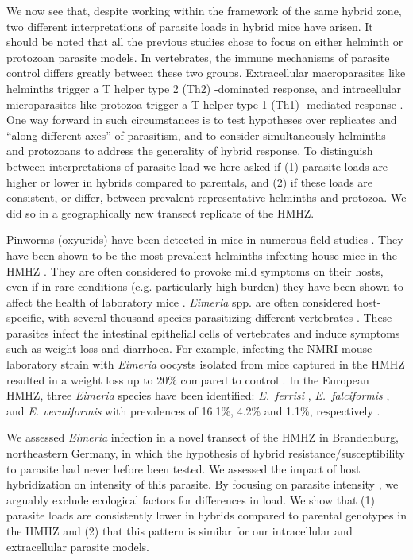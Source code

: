 \par We now see that, despite working within the framework of the same hybrid zone, two different interpretations of parasite loads in hybrid mice have arisen. It should be noted that all the previous studies chose to focus on either helminth or protozoan parasite models. In vertebrates, the immune mechanisms of parasite control differs greatly between these two groups. Extracellular macroparasites like helminths trigger a T helper type 2 (Th2) -dominated response, and intracellular microparasites like protozoa trigger a T helper type 1 (Th1) -mediated response \citep{sher_regulation_1992}. One way forward in such circumstances is to test hypotheses over replicates and “along different axes” of parasitism, and to consider simultaneously helminths and protozoans to address the generality of hybrid response. To distinguish between interpretations of parasite load we here asked if (1) parasite loads are higher or lower in hybrids compared to parentals, and (2) if these loads are consistent, or differ, between prevalent representative helminths and protozoa. We did so in a geographically new transect replicate of the HMHZ.
\par Pinworms (oxyurids) have been detected in mice in numerous field studies \parencites[see for example][]{behnke_aspiculuris_1975, behnke_aspiculuris_1976,kriska_parasitic_1993, ressouche_host_1998}. They have been shown to be the most prevalent helminths infecting house mice in the HMHZ \citep{gouy_de_bellocq_new_2012}. They are often considered to provoke mild symptoms on their hosts, even if in rare conditions (e.g. particularly high burden) they have been shown to affect the health of laboratory mice \citep{taffs_pinworm_2016}. \textit{Eimeria} spp. are often considered host-specific, with several thousand species parasitizing different vertebrates \citep{chapman_chapter_2013, haberkorn_entwicklung_1970}. These parasites infect the intestinal epithelial cells of vertebrates and induce symptoms such as weight loss and diarrhoea. For example, infecting the NMRI mouse laboratory strain with \textit{Eimeria} oocysts isolated from mice captured in the HMHZ resulted in a weight loss up to 20\% compared to control \citep{al-khlifeh_eimeria_2019}. In the European HMHZ, three \textit{Eimeria} species have been identified: \textit{E.~ferrisi} , \textit{E.~falciformis} , and \textit{E. vermiformis}  with prevalences of 16.1\%, 4.2\% and 1.1\%, respectively \citep{jarquin-diaz_detection_2019}. 
\par We assessed \textit{Eimeria} infection in a novel transect of the HMHZ in Brandenburg, northeastern Germany, in which the hypothesis of hybrid resistance/susceptibility to parasite had never before been tested. We assessed the impact of host hybridization on intensity of this parasite. By focusing on parasite intensity \parencite[extent of parasite infection in only infected animals;][]{bush_parasitology_1997}, we arguably exclude ecological factors for differences in load. We show that (1) parasite loads are consistently lower in hybrids compared to parental genotypes in the HMHZ and (2) that this pattern is similar for our intracellular and extracellular parasite models.

